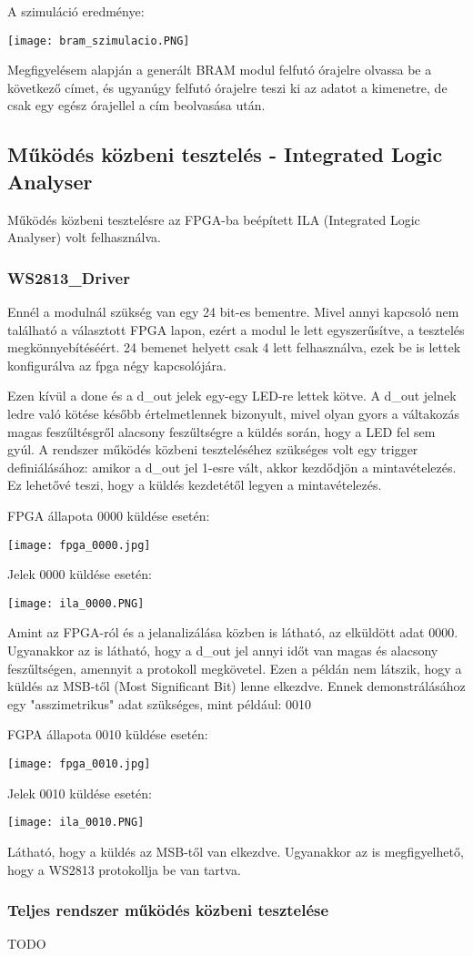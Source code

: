 \documentclass[10pt]{article} %
\begin{document}
A szimuláció eredménye:

\texttt{[image: bram\_szimulacio.PNG]}

Megfigyelésem alapján a generált BRAM modul felfutó órajelre olvassa be a következő címet, és ugyanúgy felfutó órajelre teszi ki az adatot a kimenetre, de csak egy egész órajellel a cím beolvasása után.

\subsection{Működés közbeni tesztelés - Integrated Logic Analyser}

Működés közbeni tesztelésre az FPGA-ba beépített ILA (Integrated Logic Analyser) volt felhasználva.

\subsubsection{WS2813\_Driver}

Ennél a modulnál szükség van egy 24 bit-es bementre. Mivel annyi kapcsoló nem található a választott FPGA lapon, ezért a modul le lett egyszerűsítve, a tesztelés megkönnyebítéséért. 
24 bemenet helyett csak 4 lett felhasználva, ezek be is lettek konfigurálva az fpga négy kapcsolójára.

Ezen kívül a done és a d\_out jelek egy-egy LED-re lettek kötve. A d\_out jelnek ledre való kötése később értelmetlennek bizonyult, mivel olyan gyors a váltakozás magas feszűltésgről alacsony feszűltségre
a küldés során, hogy a LED fel sem gyúl.
A rendszer működés közbeni teszteléséhez szükséges volt egy trigger definiálásához: amikor a d\_out jel 1-esre vált, akkor kezdődjön a mintavételezés. Ez lehetővé teszi, hogy a küldés kezdetétől legyen a mintavételezés.

FPGA állapota 0000 küldése esetén:

\texttt{[image: fpga\_0000.jpg]}

Jelek 0000 küldése esetén:

\texttt{[image: ila\_0000.PNG]}

Amint az FPGA-ról és a jelanalizálása közben is látható, az elküldött adat 0000. Ugyanakkor az is látható, hogy a d\_out jel annyi időt van magas és alacsony feszűltségen, amennyit a protokoll megkövetel.
Ezen a példán nem látszik, hogy a küldés az MSB-től (Most Significant Bit) lenne elkezdve. Ennek demonstrálásához egy "asszimetrikus" adat szükséges, mint például: 0010

FGPA állapota 0010 küldése esetén:

\texttt{[image: fpga\_0010.jpg]}

Jelek 0010 küldése esetén:

\texttt{[image: ila\_0010.PNG]}

Látható, hogy a küldés az MSB-től van elkezdve. Ugyanakkor az is megfigyelhető, hogy a WS2813 protokollja be van tartva.

\subsubsection{Teljes rendszer működés közbeni tesztelése}

TODO
\end{document}
